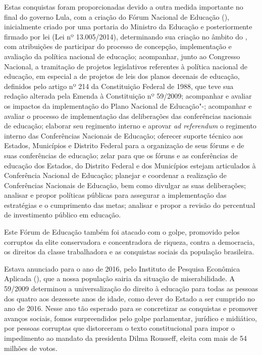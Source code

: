 Estas conquistas foram proporcionadas devido a outra medida importante
no final do governo Lula, com a criação do Fórum Nacional de Educação
(), inicialmente criado por uma portaria do Ministro da Educação e
posteriormente firmado por lei (Lei nº 13.005/2014), determinando sua
criação no âmbito do , com atribuições de participar do processo de
concepção, implementação e avaliação da política nacional de educação;
acompanhar, junto ao Congresso Nacional, a tramitação de projetos
legislativos referentes à política nacional de educação, em especial a
de projetos de leis dos planos decenais de educação, definidos pelo
artigo nº 214 da Constituição Federal de 1988, que teve sua redação
alterada pela Emenda à Constituição nº 59/2009; acompanhar e avaliar os
impactos da implementação do Plano Nacional de Educação"-; acompanhar
e avaliar o processo de implementação das deliberações das conferências
nacionais de educação; elaborar seu regimento interno e aprovar \emph{ad
referendum} o regimento interno das Conferências Nacionais de Educação;
oferecer suporte técnico aos Estados, Municípios e Distrito Federal para
a organização de seus fóruns e de suas conferências de educação; zelar
para que os fóruns e as conferências de educação dos Estados, do
Distrito Federal e dos Municípios estejam articulados à Conferência
Nacional de Educação; planejar e coordenar a realização de Conferências
Nacionais de Educação, bem como divulgar as suas deliberações; analisar
e propor políticas públicas para assegurar a implementação das
estratégias e o cumprimento das metas;
analisar e propor a revisão do
percentual de investimento público em educação.

Este Fórum de Educação também foi atacado com o golpe, promovido pelos
corruptos da elite conservadora e concentradora de riqueza, contra a
democracia, os direitos da classe trabalhadora e as conquistas sociais
da população brasileira.

Estava anunciado para o ano de 2016, pelo Instituto de Pesquisa
Econômica Aplicada (), que a nossa população sairia da situação de
miserabilidade. A  59/2009 determinou a universalização do direito à
educação para todas as pessoas dos quatro aos dezessete anos de idade,
como dever do Estado a ser cumprido no ano de 2016. Nesse ano tão
esperado para se concretizar as conquistas e promover avanços sociais,
fomos surpreendidos pelo golpe parlamentar, jurídico e midiático, por
pessoas corruptas que distorceram o texto constitucional para impor o
impedimento ao mandato da presidenta Dilma Rousseff, eleita com mais de
54 milhões de votos.

